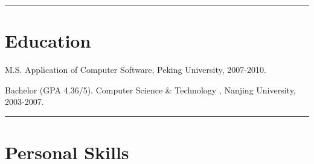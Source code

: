 \documentclass[letterpaper]{article}
\renewenvironment{itemize}{
  \begin{list}{}{
    \setlength{\leftmargin}{1.5em}
    \setlength{\itemsep}{0pt}
  }
}{
  \end{list}
}
\begin{document}
\rule{16.8cm}{0.1em}

\vspace{-1.5em}
\section*{Education}
\begin{itemize}
  \item M.S. Application of Computer Software, Peking University, 2007-2010.
  \item Bachelor (GPA 4.36/5). Computer Science \& Technology , Nanjing University, 2003-2007.
\end{itemize}

\rule{16.8cm}{0.1em}

\vspace{-1.5em}
\section*{Personal Skills}
\end{document}
